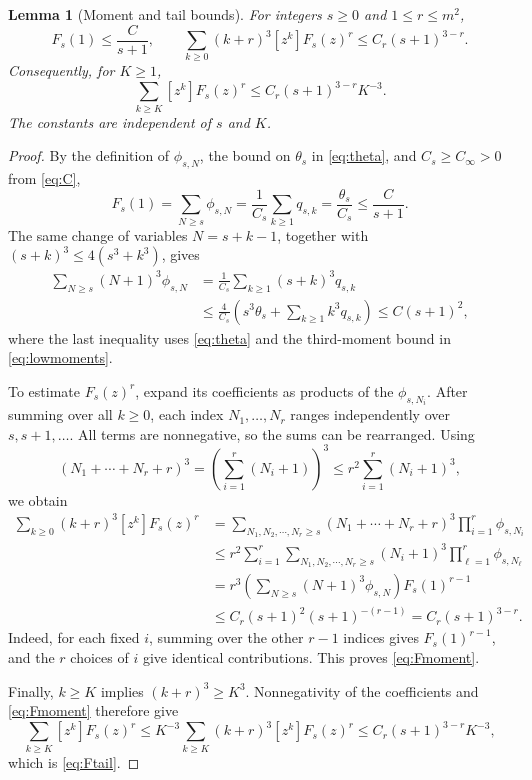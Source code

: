 \documentclass[11pt,letterpaper,reqno]{amsart}
\numberwithin{equation}{section}
\theoremstyle{plain}
\newtheorem{lemma}[theorem]{Lemma}
\theoremstyle{remark}
\begin{document}
\begin{lemma}[Moment and tail bounds]\label{lem:Fmoment}
For integers $s\ge0$ and $1\le r\le m^2$,
\begin{equation}\label{eq:Fmoment}
 F_s(1)\le\frac C{s+1},\qquad
 \sum_{k\ge0}(k+r)^3[z^k]F_s(z)^r\le C_r(s+1)^{3-r}.
\end{equation}
Consequently, for $K\ge1$,
\begin{equation}\label{eq:Ftail}
 \sum_{k\ge K}[z^k]F_s(z)^r\le C_r(s+1)^{3-r}K^{-3}.
\end{equation}
The constants are independent of $s$ and $K$.
\end{lemma}
\begin{proof}
By the definition of $\phi_{s,N}$, the bound on $\theta_s$ in \eqref{eq:theta}, and $C_s\ge C_\infty>0$ from \eqref{eq:C},
\[
 F_s(1)=\sum_{N\ge s}\phi_{s,N}
 =\frac1{C_s}\sum_{k\ge1}q_{s,k}
 =\frac{\theta_s}{C_s}\le\frac C{s+1}.
\]
The same change of variables $N=s+k-1$, together with $(s+k)^3\le4(s^3+k^3)$, gives
\[
\begin{aligned}
 \sum_{N\ge s}(N+1)^3\phi_{s,N}
 &=\frac1{C_s}\sum_{k\ge1}(s+k)^3q_{s,k}\\
 &\le\frac4{C_s}\left(s^3\theta_s+\sum_{k\ge1}k^3q_{s,k}\right)
 \le C(s+1)^2,
\end{aligned}
\]
where the last inequality uses \eqref{eq:theta} and the third-moment bound in \eqref{eq:lowmoments}.

To estimate $F_s(z)^r$, expand its coefficients as products of the $\phi_{s,N_i}$. After summing over all $k\ge0$, each index $N_1,\ldots,N_r$ ranges independently over $s,s+1,\ldots$. All terms are nonnegative, so the sums can be rearranged. Using
\[
 (N_1+\cdots+N_r+r)^3
 =\left(\sum_{i=1}^r(N_i+1)\right)^3
 \le r^2\sum_{i=1}^r(N_i+1)^3,
\]
we obtain
\[
\begin{aligned}
 \sum_{k\ge0}(k+r)^3[z^k]F_s(z)^r
  &=\sum_{N_1,N_2,\cdots,N_r\ge s}
   (N_1+\cdots+N_r+r)^3\prod_{i=1}^r\phi_{s,N_i}\\
  &\le r^2\sum_{i=1}^r\sum_{N_1,N_2,\cdots,N_r\ge s}
   (N_i+1)^3\prod_{\ell=1}^r\phi_{s,N_\ell}\\
 &=r^3\left(\sum_{N\ge s}(N+1)^3\phi_{s,N}\right)F_s(1)^{r-1}\\
 &\le C_r(s+1)^2(s+1)^{-(r-1)}
 =C_r(s+1)^{3-r}.
\end{aligned}
\]
Indeed, for each fixed $i$, summing over the other $r-1$ indices gives $F_s(1)^{r-1}$, and the $r$ choices of $i$ give identical contributions. This proves \eqref{eq:Fmoment}.

Finally, $k\ge K$ implies $(k+r)^3\ge K^3$. Nonnegativity of the coefficients and \eqref{eq:Fmoment} therefore give
\[
 \sum_{k\ge K}[z^k]F_s(z)^r
 \le K^{-3}\sum_{k\ge K}(k+r)^3[z^k]F_s(z)^r
 \le C_r(s+1)^{3-r}K^{-3},
\]
which is \eqref{eq:Ftail}.
\end{proof}
\end{document}
